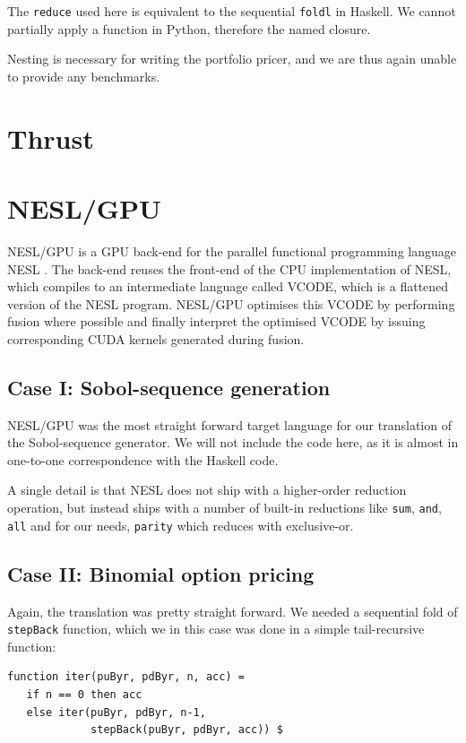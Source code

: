 \documentclass[preprint]{sigplanconf}
\begin{document}
The \verb|reduce| used here is equivalent to the sequential
\verb|foldl| in Haskell. We cannot partially apply a function in
Python, therefore the named closure.

Nesting is necessary for writing the portfolio pricer, and we are thus
again unable to provide any benchmarks.

\section{Thrust}
\todo{}

\section{NESL/GPU}
NESL/GPU is a GPU back-end for the parallel functional programming
language NESL \cite{nesl}. The back-end reuses the front-end of the
CPU implementation of NESL, which compiles to an intermediate language
called VCODE, which is a flattened version of the NESL
program. NESL/GPU optimises this VCODE by performing fusion where
possible and finally interpret the optimised VCODE by issuing
corresponding CUDA kernels generated during fusion.

\subsection{Case I: Sobol-sequence generation}
NESL/GPU was the most straight forward target language for our
translation of the Sobol-sequence generator. We will not include the
code here, as it is almost in one-to-one correspondence with the
Haskell code. 

A single detail is that NESL does not ship with a higher-order
reduction operation, but instead ships with a number of built-in
reductions like \verb|sum|, \verb|and|, \verb|all| and for our needs,
\verb|parity| which reduces with exclusive-or.

\subsection{Case II: Binomial option pricing}
Again, the translation was pretty straight forward. We needed a
sequential fold of \verb|stepBack| function, which we in this case was
done in a simple tail-recursive function:
\begin{verbatim}
function iter(puByr, pdByr, n, acc) =
   if n == 0 then acc
   else iter(puByr, pdByr, n-1, 
             stepBack(puByr, pdByr, acc)) $
\end{verbatim}
\end{document}
